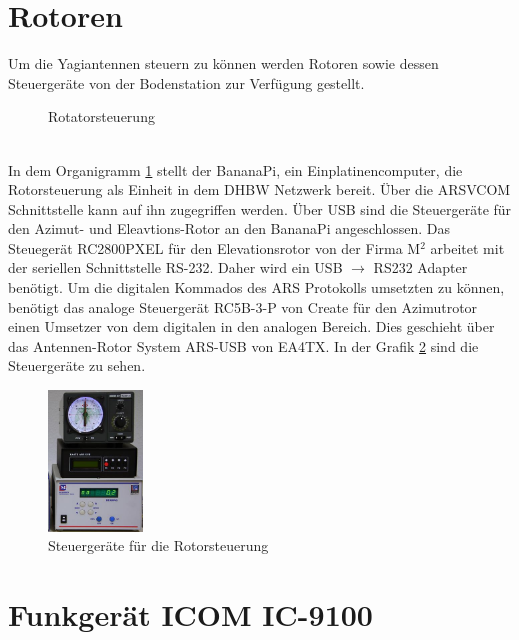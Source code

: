 \section{Rotoren}
Um die Yagiantennen steuern zu können werden Rotoren sowie dessen Steuergeräte von der Bodenstation zur Verfügung gestellt.
\begin{figure}[h]
 \centering
 
 \caption{Rotatorsteuerung}
 \label{fig:azel}
\end{figure}\\
In dem Organigramm \ref{fig:azel} stellt der BananaPi, ein Einplatinencomputer, die Rotorsteuerung als Einheit in dem DHBW Netzwerk bereit. Über die 
ARSVCOM Schnittstelle kann auf ihn zugegriffen werden. %
Über USB sind die Steuergeräte für den Azimut- und Eleavtions-Rotor an den BananaPi angeschlossen. Das Steuegerät RC2800PXEL für den Elevationsrotor 
von der Firma M$^2$ arbeitet mit der seriellen Schnittstelle RS-232. Daher wird ein USB $\rightarrow$ RS232 Adapter benötigt. Um die digitalen 
Kommados des ARS Protokolls umsetzten zu können, benötigt das analoge Steuergerät RC5B-3-P von Create für den Azimutrotor einen Umsetzer von dem 
digitalen in den analogen Bereich. Dies geschieht über das Antennen-Rotor System ARS-USB von EA4TX. In der Grafik \ref{fig:rot} sind die Steuergeräte 
zu sehen.
\begin{figure}[h]
 \centering
 \includegraphics[width=0.225\textwidth]{images/sat-rotor-steuerungen}
 \caption{Steuergeräte für die Rotorsteuerung}
 \label{fig:rot}
\end{figure}
\clearpage

\section{Funkgerät ICOM IC-9100}



 
